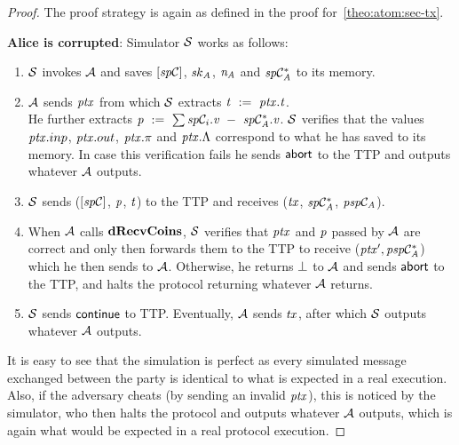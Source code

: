 \begin{proof}
    The proof strategy is again as defined in the proof for~\cref{theo:atom:sec-tx}.

    \textbf{Alice is corrupted}: Simulator $\mathcal{S}$ works as follows:
    \begin{enumerate}
        \item $\mathcal{S}$ invokes $\mathcal{A}$ and saves $[\mathit{sp}\mathcal{C}]$, $\mathit{sk}_{\mathit{A}}$, $\mathit{\mathit{n}_{\mathit{A}}}$ and $\mathit{sp}\mathcal{C}_{\mathit{A}}^*$ to its memory.
        \item $\mathcal{A}$ sends $\mathit{ptx}$ from which $\mathcal{S}$ extracts $\mathit{t} ~:=~ \mathit{ptx}.\mathit{t}$. \\
        He further extracts $\mathit{p} ~:=~ \sum\mathit{sp}\mathcal{C}_i.\mathit{v} ~-~ \mathit{sp}\mathcal{C}_{\mathit{A}}^*.\mathit{v}$.
        $\mathcal{S}$ verifies that the values $\mathit{ptx}.inp$, $\mathit{ptx}.out$, $\mathit{ptx}.\pi$ and $\mathit{ptx}.\Lambda$ correspond to what he has saved to its memory.
        In case this verification fails he sends $\mathsf{abort}$ to the TTP and outputs whatever $\mathcal{A}$ outputs.
        \item $\mathcal{S}$ sends ($[\mathit{sp}\mathcal{C}]$, $\mathit{p}$, $\mathit{t}$) to the TTP and receives ($\mathit{tx}$, $\mathit{sp}\mathcal{C}_{\mathit{A}}^*$, $\mathit{psp}\mathcal{C}_{\mathit{A}}$).
        \item When $\mathcal{A}$ calls $\mathbf{dRecvCoins}$, $\mathcal{S}$ verifies that $\mathit{ptx}$ and $\mathit{p}$ passed by $\mathcal{A}$ are correct and only then forwards them to the TTP to receive (${\mathit{ptx}}', \mathit{psp}\mathcal{C}_{\mathit{A}}^*$) which he then sends to $\mathcal{A}$.
        Otherwise, he returns $\bot$ to $\mathcal{A}$ and sends $\mathsf{abort}$ to the TTP, and halts the protocol returning whatever $\mathcal{A}$ returns.
        \item $\mathcal{S}$ sends $\mathsf{continue}$ to TTP.
        Eventually, $\mathcal{A}$ sends $\mathit{tx}$, after which $\mathcal{S}$ outputs whatever $\mathcal{A}$ outputs.
    \end{enumerate}

    It is easy to see that the simulation is perfect as every simulated message exchanged between the party is identical to what is expected in a real execution.
    Also, if the adversary cheats (by sending an invalid $\mathit{ptx}$), this is noticed by the simulator, who then halts the protocol and outputs whatever $\mathcal{A}$ outputs, which is again what would be expected in a real protocol execution.


\end{proof}
